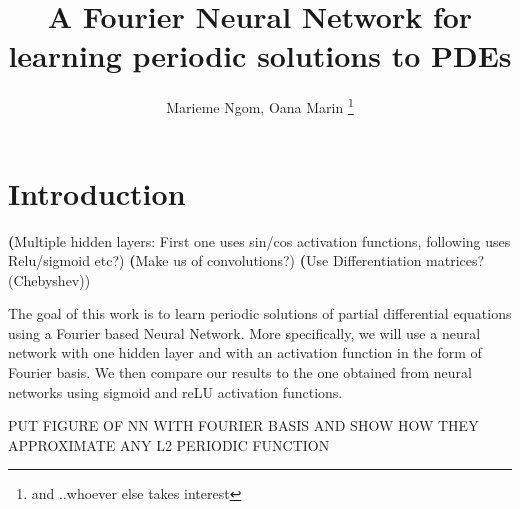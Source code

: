 \documentclass[11pt]{article}
\begin{document}

\title{A Fourier Neural Network for learning periodic solutions to PDEs}
\author{Marieme Ngom, Oana Marin \footnote{and ..whoever else takes interest}}
\maketitle
\begin{abstract}

\end{abstract}




\linenumbers

\section{Introduction}
\textbf(Multiple hidden layers: First one uses sin/cos activation functions, following uses Relu/sigmoid etc?)
\textbf(Make us of convolutions?)
\textbf(Use Differentiation matrices?(Chebyshev))


The goal of this work is to learn periodic solutions of partial differential equations using a Fourier based Neural Network. More specifically, we will use a neural network with one hidden layer and with an activation function in the form of Fourier basis. We then compare our results to the one obtained from neural networks using sigmoid and reLU activation functions.

PUT FIGURE OF NN WITH FOURIER BASIS AND SHOW HOW THEY APPROXIMATE ANY L2 PERIODIC  FUNCTION






\end{document}
